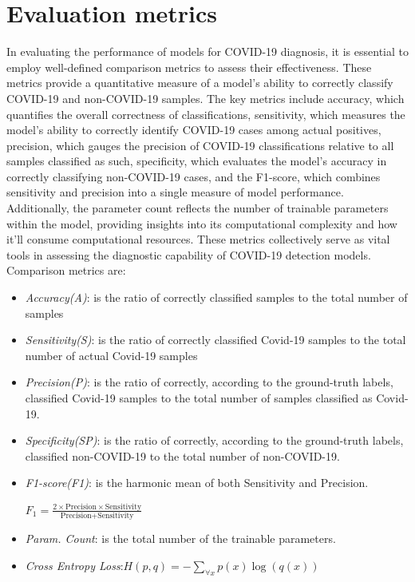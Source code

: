\section{Evaluation metrics}
In evaluating the performance of models for COVID-19 diagnosis, it is essential to employ well-defined comparison metrics to assess their effectiveness. These metrics provide a quantitative measure of a model's ability to correctly classify COVID-19 and non-COVID-19 samples. The key metrics include accuracy, which quantifies the overall correctness of classifications, sensitivity, which measures the model's ability to correctly identify COVID-19 cases among actual positives, precision, which gauges the precision of COVID-19 classifications relative to all samples classified as such, specificity, which evaluates the model's accuracy in correctly classifying non-COVID-19 cases, and the F1-score, which combines sensitivity and precision into a single measure of model performance. Additionally, the parameter count reflects the number of trainable parameters within the model, providing insights into its computational complexity and how it'll consume computational resources. These metrics collectively serve as vital tools in assessing the diagnostic capability of COVID-19 detection models.
Comparison metrics are:
\begin{itemize}
\item \textit{Accuracy(A)}: is the ratio of correctly classified samples to the total number of samples
\item \textit{Sensitivity(S)}: is the ratio of correctly classified Covid-19 samples to the total number of actual Covid-19 samples 
\item \textit{Precision(P)}: is the ratio of correctly, according to the ground-truth labels, classified Covid-19 samples to the total number of samples classified as Covid-19.
\item \textit{Specificity(SP)}: is the ratio of correctly, according to the ground-truth labels, classified non-COVID-19 to the total number of non-COVID-19.
\item \textit{F1-score(F1)}: is the harmonic mean of both Sensitivity and Precision.
\begin{center}  
 $F_{1}=\frac{2\times\text{Precision} \times \text{Sensitivity}}{\text{Precision} + \text{Sensitivity}}$
\end{center}
\item \textit{Param. Count}: is the total number of the trainable parameters.
\item \textit{Cross Entropy Loss}:$H(p,q) = -\sum_{\forall x} p(x) \log(q(x))$
\end{itemize}



